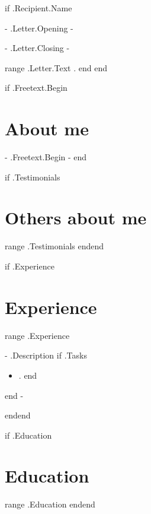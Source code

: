 \documentclass[10pt,a4paper,sans]{moderncv}
\begin{document}
{{if .Recipient.Name}}
  \date{ {{- .Letter.Date -}} }
  \opening{ {{- .Letter.Opening -}} }
  \closing{ {{- .Letter.Closing -}} }
  \makelettertitle
  {{range .Letter.Text}}
    {{.}}
  {{end}}
  \makeletterclosing
  \pagebreak
{{end}}


\makecvtitle

{{if .Freetext.Begin}}\section{About me}
{{- .Freetext.Begin -}}
{{end}}

{{if .Testimonials}}\section{Others about me}
{{range .Testimonials}}
{{end}}{{end}}


{{if .Experience}}\section{Experience}
{{range .Experience}}
{ {{- .Description}} 
  {{if .Tasks}}\begin{itemize}
    {{range .Tasks}} \item {{.}}
    {{end}}\end{itemize}
  {{end -}} }
{{end}}{{end}}

{{if .Education}}\section{Education}
{{range .Education}}
{{end}}{{end}}
\end{document}
